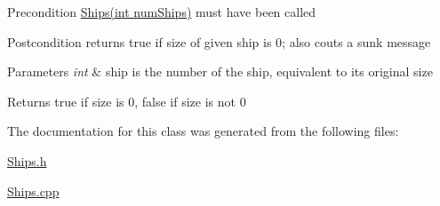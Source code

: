 \begin{DoxyPrecond}{Precondition}
\hyperlink{classShips_aabbca77f901e307950267b22383be013}{Ships(int num\+Ships)} must have been called 
\end{DoxyPrecond}
\begin{DoxyPostcond}{Postcondition}
returns true if size of given ship is 0; also couts a sunk message 
\end{DoxyPostcond}

\begin{DoxyParams}{Parameters}
{\em int} & ship is the number of the ship, equivalent to its original size \\
\hline
\end{DoxyParams}
\begin{DoxyReturn}{Returns}
true if size is 0, false if size is not 0 
\end{DoxyReturn}


The documentation for this class was generated from the following files\+:\begin{DoxyCompactItemize}
\item 
\hyperlink{Ships_8h}{Ships.\+h}\item 
\hyperlink{Ships_8cpp}{Ships.\+cpp}\end{DoxyCompactItemize}
